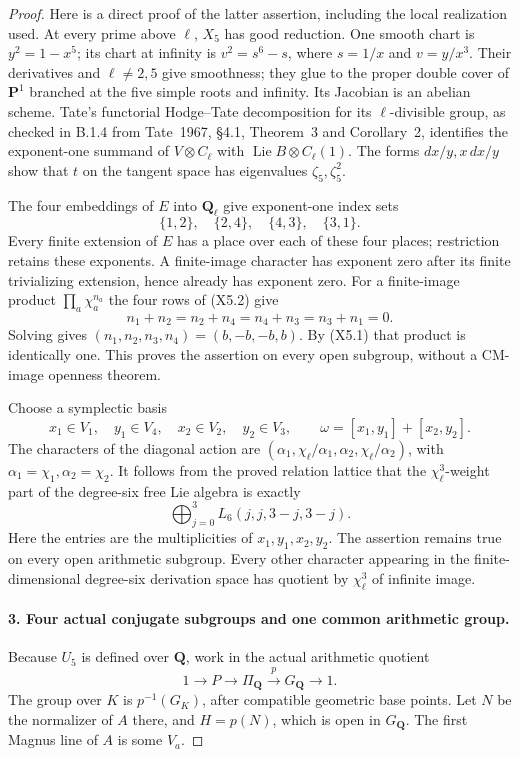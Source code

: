 \begin{proof}
Here is a direct proof of the latter assertion, including
the local realization used. At every prime above $\ell$,
$X_5$ has good reduction. One smooth chart is
$y^2=1-x^5$; its chart at infinity is
$v^2=s^6-s$, where $s=1/x$ and $v=y/x^3$.
Their derivatives and $\ell\ne2,5$ give smoothness; they
glue to the proper double cover of $\mathbf P^1$ branched
at the five simple roots and infinity. Its Jacobian is an
abelian scheme. Tate's functorial Hodge--Tate decomposition
for its $\ell$-divisible group, as checked in B.1.4 from
Tate~1967, \S4.1, Theorem~3 and Corollary~2, identifies\cite{Tate1967} the
exponent-one summand of $V\otimes C_\ell$ with
$\operatorname{Lie}B\otimes C_\ell(1)$.
The forms $dx/y,x\,dx/y$ show that $t$ on the tangent
space has eigenvalues $\zeta_5,\zeta_5^2$.

The four embeddings of $E$ into $\mathbf Q_\ell$ give
exponent-one index sets
\[
 \{1,2\},\quad \{2,4\},\quad \{4,3\},\quad \{3,1\}.
 \tag{X5.2}
\]
Every finite extension of $E$ has a place over each of these
four places; restriction retains these exponents. A
finite-image character has exponent zero after its finite
trivializing extension, hence already has exponent zero.
For a finite-image product $\prod_a\chi_a^{n_a}$ the four
rows of (X5.2) give
\[
 n_1+n_2=n_2+n_4=n_4+n_3=n_3+n_1=0.
\]
Solving gives
$(n_1,n_2,n_3,n_4)=(b,-b,-b,b)$. By (X5.1) that
product is identically one. This proves the assertion on
every open subgroup, without a CM-image openness theorem.

Choose a symplectic basis
\[
 x_1\in V_1,\quad y_1\in V_4,\quad
 x_2\in V_2,\quad y_2\in V_3,
 \qquad \omega=[x_1,y_1]+[x_2,y_2].
\]
The characters of the diagonal action are
$(\alpha_1,\chi_\ell/\alpha_1,
  \alpha_2,\chi_\ell/\alpha_2)$, with
$\alpha_1=\chi_1,\alpha_2=\chi_2$.
It follows from the proved relation lattice that the
$\chi_\ell^3$-weight part of the degree-six free Lie algebra
is exactly
\[
 \bigoplus_{j=0}^3 L_6(j,j,3-j,3-j).
 \tag{X5.3}
\]
Here the entries are the multiplicities of
$x_1,y_1,x_2,y_2$. The assertion remains true on every open
arithmetic subgroup. Every other character appearing in the
finite-dimensional degree-six derivation space has quotient
by $\chi_\ell^3$ of infinite image.

\paragraph{3. Four actual conjugate subgroups and one common arithmetic group.}
Because $U_5$ is defined over $\mathbf Q$, work in the
actual arithmetic quotient
\[
 1\longrightarrow P\longrightarrow\Pi_{\mathbf Q}
   \xrightarrow{p}G_{\mathbf Q}\longrightarrow1.
\]
The group over $K$ is $p^{-1}(G_K)$, after compatible
geometric base points. Let $N$ be the normalizer of $A$
there, and $H=p(N)$, which is open in $G_{\mathbf Q}$.
The first Magnus line of $A$ is some $V_a$.


\end{proof}
